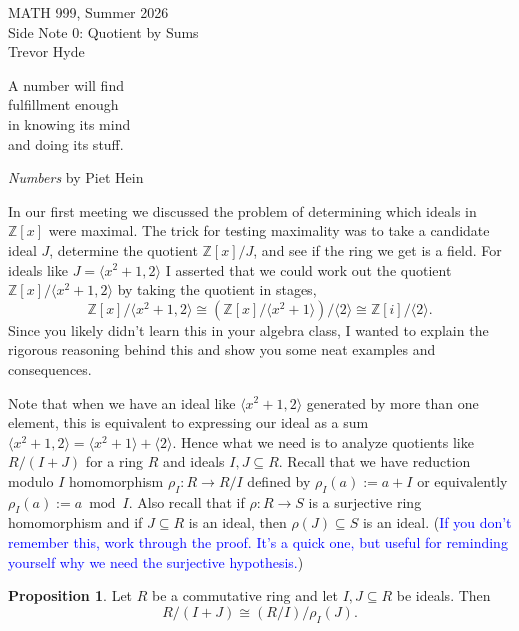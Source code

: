 \documentclass[11pt]{article}
\def\ZZ{\mathbb{Z}}
\theoremstyle{definition}
\newtheorem{proposition}[theorem]{Proposition}
\numberwithin{equation}{subsection}
\newcommand{\head}[1]{
	\begin{center}
		{\large #1}
		\vspace{.05 in}
	\end{center}
	\bigskip 
}
\newcommand{\blue}[1]{\textcolor{blue}{#1}}
\begin{document}
\pagestyle{plain}

\setcounter{section}{0}   

\head{MATH 999, Summer 2026\\ Side Note 0: Quotient by Sums\\
Trevor Hyde}


\begin{center}
   A number will find\\
   fulfillment enough\\
   in knowing its mind\\
   and doing its stuff.\\
   \vspace{.1in}

   \emph{Numbers} by Piet Hein
\end{center}
\vspace{.1in}

In our first meeting we discussed the problem of determining which ideals in $\ZZ[x]$ were maximal.
The trick for testing maximality was to take a candidate ideal $J$, determine the quotient $\ZZ[x]/J$, and see if the ring we get is a field.
For ideals like $J = \langle x^2 + 1, 2\rangle$ I asserted that we could work out the quotient $\ZZ[x]/\langle x^2 +1, 2\rangle$ by taking the quotient in stages,
\[
    \ZZ[x]/\langle x^2 +1, 2\rangle \cong (\ZZ[x]/\langle x^2 + 1\rangle)/\langle 2\rangle
    \cong \ZZ[i]/\langle 2 \rangle .
\]
Since you likely didn't learn this in your algebra class, I wanted to explain the rigorous reasoning behind this and show you some neat examples and consequences.

Note that when we have an ideal like $\langle x^2 + 1, 2\rangle$ generated by more than one element, this is equivalent to expressing our ideal as a sum $\langle x^2 + 1, 2\rangle = \langle x^2 + 1\rangle + \langle 2 \rangle$.
Hence what we need is to analyze quotients like $R/(I + J)$ for a ring $R$ and ideals $I, J \subseteq R$.
Recall that we have reduction modulo $I$ homomorphism $\rho_I : R \to R/I$ defined by $\rho_I(a) := a + I$ or equivalently $\rho_I(a) := a \bmod I$.
Also recall that if $\rho : R \to S$ is a surjective ring homomorphism and if $J \subseteq R$ is an ideal, then $\rho(J) \subseteq S$ is an ideal.
(\blue{If you don't remember this, work through the proof.
It's a quick one, but useful for reminding yourself why we need the surjective hypothesis.})

\begin{proposition}
    Let $R$ be a commutative ring and let $I, J \subseteq R$ be ideals.
    Then
    \[
        R/(I + J) \cong (R/I)/\rho_I(J).
    \]
\end{proposition}
\end{document}
